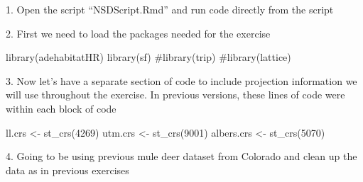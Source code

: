\documentclass[
  letterpaper,
]{book}
\newenvironment{Shaded}{\begin{snugshade}}{\end{snugshade}}
\newcommand{\AttributeTok}[1]{\textcolor[rgb]{0.40,0.45,0.13}{#1}}
\newcommand{\CommentTok}[1]{\textcolor[rgb]{0.37,0.37,0.37}{#1}}
\newcommand{\DecValTok}[1]{\textcolor[rgb]{0.68,0.00,0.00}{#1}}
\newcommand{\FunctionTok}[1]{\textcolor[rgb]{0.28,0.35,0.67}{#1}}
\newcommand{\NormalTok}[1]{\textcolor[rgb]{0.00,0.23,0.31}{#1}}
\newcommand{\OtherTok}[1]{\textcolor[rgb]{0.00,0.23,0.31}{#1}}
\newcommand{\SpecialCharTok}[1]{\textcolor[rgb]{0.37,0.37,0.37}{#1}}
\newcommand{\StringTok}[1]{\textcolor[rgb]{0.13,0.47,0.30}{#1}}
\begin{document}
1. Open the script ``NSDScript.Rmd'' and run code directly from the
script

2. First we need to load the packages needed for the exercise

\begin{Shaded}
\begin{Highlighting}[]
\FunctionTok{library}\NormalTok{(adehabitatHR)}
\FunctionTok{library}\NormalTok{(sf)}
\CommentTok{\#library(trip)}
\CommentTok{\#library(lattice)}
\end{Highlighting}
\end{Shaded}

3. Now let's have a separate section of code to include projection
information we will use throughout the exercise. In previous versions,
these lines of code were within each block of code

\begin{Shaded}
\begin{Highlighting}[]
\NormalTok{ll.crs }\OtherTok{\textless{}{-}} \FunctionTok{st\_crs}\NormalTok{(}\DecValTok{4269}\NormalTok{)}
\NormalTok{utm.crs }\OtherTok{\textless{}{-}} \FunctionTok{st\_crs}\NormalTok{(}\DecValTok{9001}\NormalTok{)}
\NormalTok{albers.crs }\OtherTok{\textless{}{-}} \FunctionTok{st\_crs}\NormalTok{(}\DecValTok{5070}\NormalTok{)}
\end{Highlighting}
\end{Shaded}

4. Going to be using previous mule deer dataset from Colorado and clean
up the data as in previous exercises

\begin{Shaded}
\end{Shaded}
\end{document}
